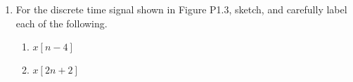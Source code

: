 \begin{enumerate}
\begin{enumerate}
          $$E_{\infty}=\lim_{T\to\infty}\int_{-T}^T(2+2\cos(t))^2\,dt$$
          $$E_{\infty}=\infty$$
          $$\therefore\text{ Energy is infinite}$$

          \begin{center}
            $$\boxed{\text{Since power is finite and energy is infinite, this is a power signal}}$$
          \end{center}

        \item $x_3[n]=\left\{\begin{array}{l r} (.5)^n,\, & n\geq0\\ 0,\, & \text{Otherwise}\end{array}$

            $$E_{\infty}=\lim_{N\to\infty}\sum_{n=0}^N \left( .25 \right)^n$$
            \begin{center}
              A geometric series must be finite:
            \end{center}
            $$E_{\infty}\approx \left( \frac{1}{1-.25} \right)\approx \frac{4}{3}$$

            $$P_{\infty}=\lim_{N\to\infty}\frac{4/3}{2N+1}\approx 0$$

            \begin{center}
              $\boxed{\text{As such, because energy is finite and average power is 0, this is an energy signal}}$
            \end{center}

    \end{enumerate}

  \item For the discrete time signal shown in Figure P1.3, sketch, and carefully label each of the following.

    \begin{enumerate}

      \item $x[n-4]$

        \begin{figure}[H]
          \centering
          
          \label{fig:8}
        \end{figure}

      \item $x[2n+2]$

        \begin{figure}[H]
          \centering
          
          \label{fig:9}
        \end{figure}


\end{enumerate}
\end{enumerate}
